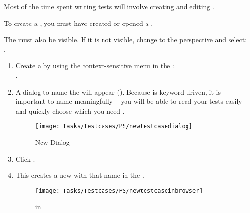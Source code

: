 
Most of the time spent writing tests will involve creating and editing \gdcases{}. 

To create a \gdcase{}, you must have created or opened a \gdproject{} . 

The \gdtestcasebrowser{} must also be visible. If it is not visible, change to the \specpersp{} perspective and select:\\
.


\begin{enumerate}
\item Create a \gdcase{} by using the context-sensitive menu in the \gdtestcasebrowser{}:\\
.

\item A dialog to name the \gdcase{} will appear (). Because \app{} is keyword-driven, it is important to name \gdcases{} meaningfully --  you will be able to read your tests easily and quickly choose which \gdcase{} you need  . 

\begin{figure}[h]
\begin{center}
\texttt{[image: Tasks/Testcases/PS/newtestcasedialog]}
\caption{New \gdcase{} Dialog}
\label{newtestcasedialog}
\end{center}
\end{figure} 

\item Click . 
\item This creates a new \gdcase{} with that name in the \gdtestcasebrowser{} .

\begin{figure}[h]
\begin{center}
\texttt{[image: Tasks/Testcases/PS/newtestcaseinbrowser]}
\caption{\gdcase{} in \gdtestcasebrowser{}}
\label{newtestcaseinbrowser}
\end{center}
\end{figure} 

\end{enumerate}

